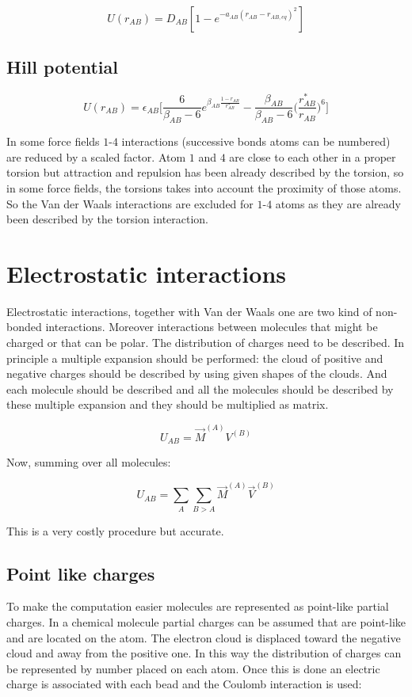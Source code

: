 		$$U(r_{AB}) = D_{AB}[1-e^{-a_{AB}(r_{AB}-r_{AB,eq})^2}]$$

		\subsection{Hill potential}

		$$U(r_{AB}) = \epsilon_{AB}\biggl[\frac{6}{\beta_{AB}-6}e^{\beta_{AB}\frac{1-r_{AB}}{r^*_{AB}}}-\frac{\beta_{AB}}{\beta_{AB}-6}\biggl(\frac{r^*_{AB}}{r_{AB}}\biggr)^6\biggr]$$

		In some force fields $1$-$4$ interactions (successive bonds atoms can be numbered) are reduced by a scaled factor.
		Atom $1$ and $4$ are close to each other in a proper torsion but attraction and repulsion has been already described by the torsion, so in some force fields, the torsions takes into account the proximity of those atoms.
		So the Van der Waals interactions are excluded for $1$-$4$ atoms as they are already been described by the torsion interaction.


\section{Electrostatic interactions}
Electrostatic interactions, together with Van der Waals one are two kind of non-bonded interactions.
Moreover interactions between molecules that might be charged or that can be polar.
The distribution of charges need to be described.
In principle a multiple expansion should be performed: the cloud of positive and negative charges should be described by using given shapes of the clouds.
And each molecule should be described and all the molecules should be described by these multiple expansion and they should be multiplied as matrix.

$$U_{AB} = \vec{M}^{(A)}V^{(B)}$$

Now, summing over all molecules:

$$U_{AB} = \sum\limits_{A}\sum\limits_{B>A}\vec{M}^{(A)}\vec{V}^{(B)}$$

This is a very costly procedure but accurate.

	\subsection{Point like charges}
	To make the computation easier molecules are represented as point-like partial charges.
	In a chemical molecule partial charges can be assumed that are point-like and are located on the atom.
	The electron cloud is displaced toward the negative cloud and away from the positive one.
	In this way the distribution of charges can be represented by number placed on each atom.
	Once this is done an electric charge is associated with each bead and the Coulomb interaction is used:

